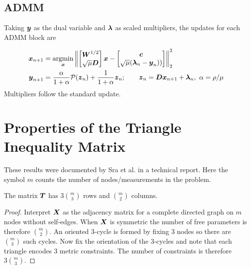\documentclass{article}
\begin{document}
\subsection*{ADMM}

Taking $\boldsymbol{y}$ as the dual variable and $\boldsymbol{\lambda}$ as scaled multipliers, the updates for each ADMM block are

\begin{align*}
  \boldsymbol{x}_{n+1}
  &= \underset{\boldsymbol{x}}{\mathop{\rm argmin}\nolimits} \left\|
    \begin{bmatrix}
      \boldsymbol{W}^{1/2} \\
      \sqrt{\mu} \boldsymbol{D}
    \end{bmatrix} \boldsymbol{x}
    -
    \begin{bmatrix}
      \boldsymbol{c} \\
      \sqrt{\mu} (\boldsymbol{\lambda}_{n} - \boldsymbol{y}_{n}))
    \end{bmatrix}
  \right\|_{2}^{2} \\
  \boldsymbol{y}_{n+1}
  &= \frac{\alpha}{1+\alpha} \mathcal{P}(\boldsymbol{z}_{n}) + \frac{1}{1+\alpha} \boldsymbol{z}_{n};
  \qquad \boldsymbol{z}_{n} = \boldsymbol{D} \boldsymbol{x}_{n+1} + \boldsymbol{\lambda}_{n},~\alpha = \rho / \mu
\end{align*}
Multipliers follow the standard update.

\section*{\center Properties of the Triangle Inequality Matrix}

These results were documented by Sra et al. in a technical report.
Here the symbol $m$ counts the number of nodes/measurements in the problem.

\begin{proposition}
    The matrix \(\boldsymbol{T}\) has \(3 \binom{m}{3}\) rows and \(\binom{m}{2}\) columns.
\end{proposition}
\begin{proof}
    Interpret \(\boldsymbol{X}\) as the adjacency matrix for a complete directed graph on \(m\) nodes without self-edges.
    When \(\boldsymbol{X}\) is symmetric the number of free parameters is therefore \(\binom{m}{2}\).
    An oriented \(3\)-cycle is formed by fixing \(3\) nodes so there are \(\binom{m}{3}\) such cycles.
    Now fix the orientation of the \(3\)-cycles and note that each triangle encodes \(3\) metric constraints.
    The number of constraints is therefore \(3 \binom{m}{3}\).
\end{proof}
\end{document}

